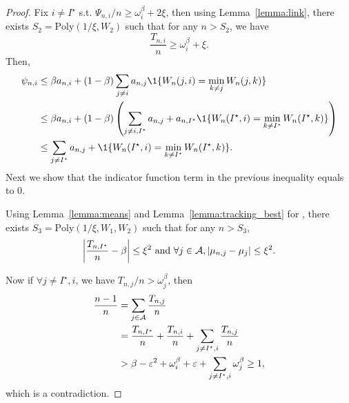 \begin{proof}
    Fix $i\neq I^\star$ s.t. $\Psi_{n,i}/n\geq \omega_i^\beta+2\xi$, then using Lemma~\ref{lemma:link}, there exists $S_2=\text{Poly}(1/\xi,W_2)$ such that for any $n>S_2$, we have
    \[
        \frac{T_{n,i}}{n} \geq \omega_i^\beta + \xi.
    \]
    Then,
    \begin{align*}
        \psi_{n,i} &\leq \beta a_{n,i} + (1-\beta) \sum_{j\neq i} a_{n,j}\1\{W_n(j,i)=\min_{k\neq j} W_n(j,k)\}\\
                   &\leq \beta a_{n,i} + (1-\beta) \left(\sum_{j\neq i,I^\star} a_{n,j} + a_{n,I^\star}\1\{W_n(I^\star,i)=\min_{k\neq I^\star} W_n(I^\star,k)\}\right)\\
                   &\leq \sum_{j\neq I^\star} a_{n,j} + \1\{W_n(I^\star,i)=\min_{k\neq I^\star} W_n(I^\star,k)\}.
    \end{align*}
    Next we show that the indicator function term in the previous inequality equals to 0.
    
    Using Lemma~\ref{lemma:means} and Lemma~\ref{lemma:tracking_best} for \TCC, there exists $S_3 = \text{Poly}(1/\xi,W_1,W_2)$ such that for any $n>S_3$,
    \[
        \left|\frac{T_{n,I^\star}}{n} - \beta\right| \leq \xi^2 \text{ and } \forall j \in\mathcal{A}, |\mu_{n,j}-\mu_j|\leq\xi^2.
    \]
    
    Now if $\forall j \neq I^\star,i$, we have $T_{n,j}/n>\omega_j^\beta$, then
    \begin{align*}
        \frac{n-1}{n} &= \sum_{j\in\mathcal{A}}\frac{T_{n,j}}{n}\\
                      &= \frac{T_{n,I^\star}}{n} + \frac{T_{n,i}}{n} + \sum_{j\neq I^\star,i}\frac{T_{n,j}}{n}\\
                      &> \beta - \varepsilon^2 + \omega_i^\beta + \varepsilon + \sum_{j\neq I^\star,i} \omega_j^\beta \geq 1,
    \end{align*}
    which is a contradiction.
    

\end{proof}
